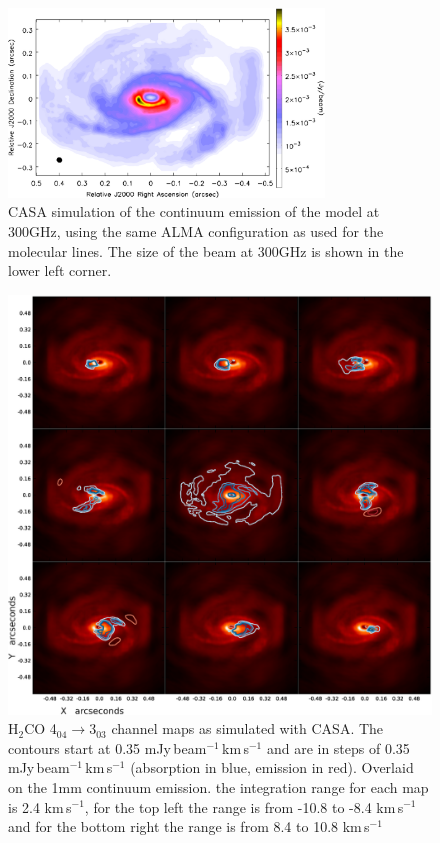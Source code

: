 \documentclass[useAMS,usenatbib]{mn2e}
\begin{document}
\begin{figure}
 \includegraphics[width=84mm]{Figures/sim/casa_cont_300GHz_invert2.eps}

 \caption{CASA simulation of the continuum emission of the model at 300GHz, using the same ALMA configuration as used for the molecular lines. The size of the beam at 300GHz is shown in the lower left corner.}
 \label{continuum}
\end{figure}

\begin{figure}
 \includegraphics[width=168mm]{Figures/sim/channel_map-2.eps} 
 \caption{H$_2$CO 4$_{04}\rightarrow$3$_{03}$ channel maps as simulated with CASA. The contours start at 0.35 mJy$\,$beam$^{-1}\,$km$\,$s$^{-1}$  and are in steps of 0.35 mJy$\,$beam$^{-1}\,$km$\,$s$^{-1}$ (absorption in blue, emission in red). Overlaid on the 1mm continuum emission. the integration range for each map is 2.4 km$\,$s$^{-1}$, for the top left the range is from -10.8 to -8.4 km$\,$s$^{-1}$ and for the bottom right the range is from 8.4 to 10.8 km$\,$s$^{-1}$}
 \label{h2co_chanmap}
\end{figure}
\end{document}

